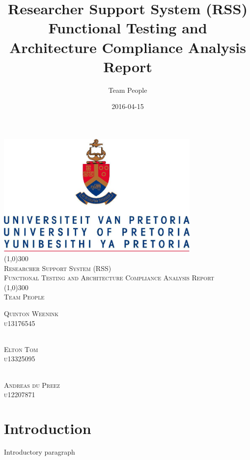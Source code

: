 \documentclass{article}
\title{
Researcher Support System (RSS)\\
Functional Testing and Architecture Compliance Analysis Report
}
\date{2016-04-15}
\author{Team People}
\begin{document}
\begin{titlepage}
	\begin{center}
		\includegraphics[width=10cm]{UP.jpg}  \\
		[1cm]
		\line(1,0){300} \\
		[0.3cm]
		\textsc{\Large
			Researcher Support System (RSS)\\
			Functional Testing and Architecture Compliance Analysis Report
		}\\
		[0.1cm]
		\line(1,0){300} \\
		[0.4cm]
		\textsc{\Large
			Team People
		} \\

	\end{center}
	\begin{flushright}
	\textsc{\Large
	Quinton Weenink\\ 
	u13176545\\
	}
	
	\textsc{\large\\
	Elton Tom\\ 
	u13325095\\ 
	}
	
	\textsc{\large\\
		Andreas du Preez\\ 
		u12207871\\ 
	}
	
	\end{flushright}
\end{titlepage}

\tableofcontents
\thispagestyle{empty}
\cleardoublepage

\setcounter{page}{1}
\section{Introduction}
Introductory paragraph

\newpage
\end{document}
